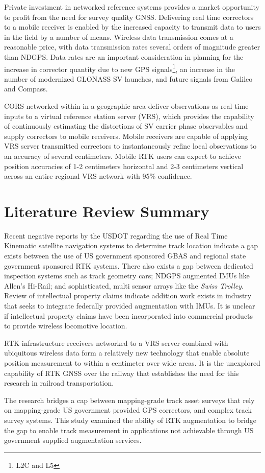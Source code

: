 Private investment in networked reference systems provides a market opportunity to profit from the need for survey quality GNSS. Delivering real time correctors to a mobile receiver is enabled by the increased capacity to transmit data to users in the field by a number of means. Wireless data transmission comes at a reasonable price, with data transmission rates several orders of magnitude greater than NDGPS. Data rates are an important consideration in planning for the increase in corrector quantity due to new GPS signals\footnote{L2C and L5}, an increase in the number of modernized GLONASS SV launches, and future signals from Galileo and Compass.

CORS networked within in a geographic area deliver observations as real time inputs to a virtual reference station server (VRS), which provides the capability of continuously estimating the distortions of SV carrier phase observables and supply correctors to mobile receivers.  Mobile receivers are capable of applying VRS server transmitted correctors to instantaneously refine local observations to an accuracy of several centimeters. Mobile RTK users can expect to achieve position accuracies of 1-2 centimeters horizontal and 2-3 centimeters vertical across an entire regional VRS network with 95\% confidence.

\section{Literature Review Summary}

Recent negative reports by the USDOT regarding the use of Real Time Kinematic satellite navigation systems to determine track location indicate a gap exists between the use of US government sponsored GBAS and regional state government sponsored RTK systems. There also exists a gap between dedicated inspection systems such as track geometry cars; NDGPS augmented IMUs like Allen's Hi-Rail; and sophisticated, multi sensor arrays like the \emph{Swiss Trolley}. Review of intellectual property claims indicate addition work exists in industry that seeks to integrate federally provided augmentation with IMUs. It is unclear if intellectual property claims have been incorporated into commercial products to provide wireless locomotive location.

RTK infrastructure receivers networked to a VRS server combined with ubiquitous wireless data form a relatively new technology that enable absolute position measurement to within a centimeter over wide areas. It is the unexplored capability of RTK GNSS over the railway that establishes the need for this research in railroad transportation.

The research bridges a cap between mapping-grade track asset surveys that rely on mapping-grade US government provided GPS correctors, and complex track survey systems. This study examined the ability of RTK augmentation to bridge the gap to enable track measurement in applications not achievable through US government supplied augmentation services.
